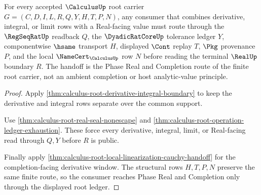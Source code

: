 \begin{theorem}
\label{thm:calculus-root-real-completion-operation-handoff}
For every accepted $\CalculusUp$ root carrier $G=(C,D,I,L,R,Q,Y,H,T,P,N)$, any consumer that combines derivative, integral, or limit rows with a Real-facing value must route through the $\RegSeqRatUp$ readback $Q$, the $\DyadicRatCoreUp$ tolerance ledger $Y$, componentwise $\hsame$ transport $H$, displayed $\Cont$ replay $T$, $\Pkg$ provenance $P$, and the local $\NameCert_{\CalculusUp}$ row $N$ before reading the terminal $\RealUp$ boundary $R$. The handoff is the Phase Real and Completion route of the finite root carrier, not an ambient completion or host analytic-value principle.
\end{theorem}
\begin{proof}
Apply \autoref{thm:calculus-root-derivative-integral-boundary} to keep the derivative and integral rows separate over the common support.

Use \autoref{thm:calculus-root-real-seal-nonescape} and \autoref{thm:calculus-root-operation-ledger-exhaustion}. These force every derivative, integral, limit, or Real-facing read through $Q,Y$ before $R$ is public.

Finally apply \autoref{thm:calculus-root-local-linearization-cauchy-handoff} for the completion-facing derivative window. The structural rows $H,T,P,N$ preserve the same finite route, so the consumer reaches Phase Real and Completion only through the displayed root ledger.
\end{proof}

